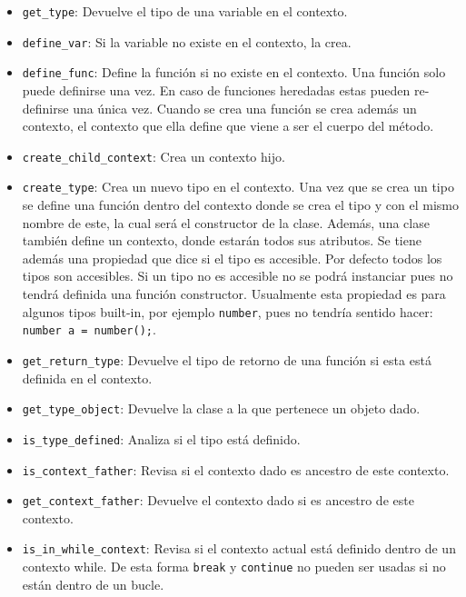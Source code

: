 \begin{itemize}
\begin{itemize}
	\item \verb|get_type|: Devuelve el tipo de una variable en el contexto.
	
	\item \verb|define_var|: Si la variable no existe en el contexto, la crea. 
	
	\item \verb|define_func|: Define la funci\'on si no existe en el contexto. Una función solo puede definirse una vez. En caso de funciones heredadas estas pueden re-definirse una única vez. Cuando se crea una función se crea además un contexto, el contexto que ella define que viene a ser el cuerpo del método.
	
	\item \verb|create_child_context|: Crea un contexto hijo.
	
	\item \verb|create_type|: Crea un nuevo tipo en el contexto. Una vez que se crea un tipo se define una función dentro del contexto donde se crea el tipo y con el mismo nombre de este, la cual será el constructor de la clase. Además, una clase también define un contexto, donde estarán todos sus atributos. Se tiene además una propiedad que dice si el tipo es accesible. Por defecto todos los tipos son accesibles. Si un tipo no es accesible no se podrá instanciar pues no tendrá definida una función constructor. Usualmente esta propiedad es para algunos tipos built-in, por ejemplo \verb|number|, pues no tendría sentido hacer: \verb|number a = number();|.
	
	\item \verb|get_return_type|: Devuelve el tipo de retorno de una funci\'on si esta est\'a definida en el contexto.
	
	\item \verb|get_type_object|: Devuelve la clase a la que pertenece un objeto dado. 
	
	\item \verb|is_type_defined|: Analiza si el tipo est\'a definido.
	
	\item \verb|is_context_father|: Revisa si el contexto dado es ancestro de este contexto.
	
	\item \verb|get_context_father|: Devuelve el contexto dado si es ancestro de este contexto.
	
	\item \verb|is_in_while_context|: Revisa si el contexto actual está definido dentro de un contexto while. De esta forma \verb|break| y \verb|continue| no pueden ser usadas si no están dentro de un bucle.
	

\end{itemize}
\end{itemize}
